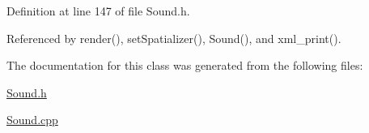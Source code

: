 Definition at line 147 of file Sound.h.

Referenced by render(), set\-Spatializer(), Sound(), and xml\_\-print().

The documentation for this class was generated from the following files:\begin{CompactItemize}
\item 
\hyperlink{Sound_8h}{Sound.h}\item 
\hyperlink{Sound_8cpp}{Sound.cpp}\end{CompactItemize}
